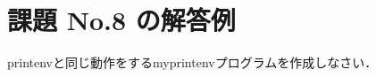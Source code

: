 \documentclass[a4j,twcolumn,11pt,nomag]{ltjarticle}      %
\begin{document}
\onecolumn

\section*{課題 No.8 の解答例}
printenvと同じ動作をするmyprintenvプログラムを作成しなさい．
\end{document}
